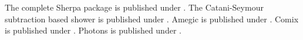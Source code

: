 \documentclass{article}
\begin{document}
The complete Sherpa package is published under \cite{Gleisberg:2008ta}.
The Catani-Seymour subtraction based shower is published under \cite{Schumann:2007mg}.
Amegic is published under \cite{Krauss:2001iv}.
Comix is published under \cite{Gleisberg:2008fv}.
Photons is published under \cite{Schonherr:2008av}.
\end{document}
